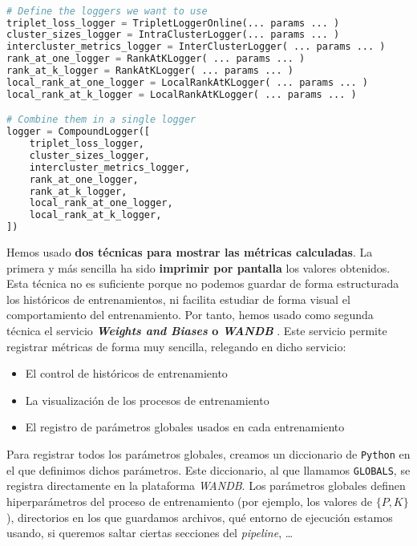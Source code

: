\begin{lstlisting}[language=python, caption=Ejemplo de configuración del \textit{logging} de un entrenamiento con nuestro sistema propio. Se ve claramente la ventaja de usar un patrón \textit{composite} a la hora de configurar qué \textit{loggers} queremos usar, captionpos=b]

# Define the loggers we want to use
triplet_loss_logger = TripletLoggerOnline(... params ... )
cluster_sizes_logger = IntraClusterLogger(... params ... )
intercluster_metrics_logger = InterClusterLogger( ... params ... )
rank_at_one_logger = RankAtKLogger( ... params ... )
rank_at_k_logger = RankAtKLogger( ... params ... )
local_rank_at_one_logger = LocalRankAtKLogger( ... params ... )
local_rank_at_k_logger = LocalRankAtKLogger( ... params ... )

# Combine them in a single logger
logger = CompoundLogger([
    triplet_loss_logger,
    cluster_sizes_logger,
    intercluster_metrics_logger,
    rank_at_one_logger,
    rank_at_k_logger,
    local_rank_at_one_logger,
    local_rank_at_k_logger,
])
\end{lstlisting}

Hemos usado \textbf{dos técnicas para mostrar las métricas calculadas}. La primera y más sencilla ha sido \textbf{imprimir por pantalla} los valores obtenidos. Esta técnica no es suficiente porque no podemos guardar de forma estructurada los históricos de entrenamientos, ni facilita estudiar de forma visual el comportamiento del entrenamiento. Por tanto, hemos usado como segunda técnica el servicio \textbf{\textit{Weights and Biases} o \textit{WANDB}} \cite{informatica:wandb_web}. Este servicio permite registrar métricas de forma muy sencilla, relegando en dicho servicio:

\begin{itemize}
    \item El control de históricos de entrenamiento
    \item La visualización de los procesos de entrenamiento
    \item El registro de parámetros globales usados en cada entrenamiento
\end{itemize}

Para registrar todos los parámetros globales, creamos un diccionario de \lstinline{Python} en el que definimos dichos parámetros. Este diccionario, al que llamamos \lstinline{GLOBALS}, se registra directamente en la plataforma \textit{WANDB}. Los parámetros globales definen hiperparámetros del proceso de entrenamiento (por ejemplo, los valores de $\{P, K\}$), directorios en los que guardamos archivos, qué entorno de ejecución estamos usando, si queremos saltar ciertas secciones del \textit{pipeline}, \ldots

